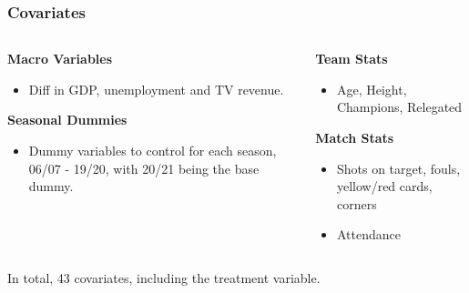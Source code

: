 \documentclass{beamer}
\begin{document}
\begin{frame}
\frametitle{Covariates}

	\begin{columns}[T]
		\begin{column}{.48\textwidth}
			\textbf{Macro Variables}
			\begin{itemize}
				\item Diff in GDP, unemployment and TV revenue. 
			\end{itemize}				
			
			\textbf{Seasonal Dummies}				
			\begin{itemize}
				\item Dummy variables to control for each season, 06/07 - 19/20, with 20/21 being the base 								dummy. 
			\end{itemize}
		\end{column}
		
		\begin{column}{.48\textwidth}			
			\textbf{Team Stats}
			\begin{itemize}
				\item Age, Height, Champions, Relegated
			\end{itemize}
			
			\textbf{Match Stats}
			\begin{itemize}
				\item Shots on target, fouls, yellow/red cards, corners
				\item Attendance 
			\end{itemize}
		\end{column}
	\end{columns}

\begin{center}
	In total, 43 covariates, including the treatment variable. 
\end{center}

\end{frame}


\end{document}
